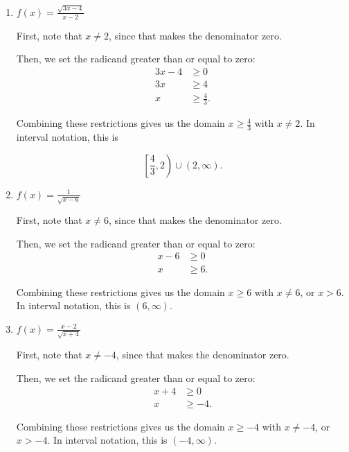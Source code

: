 \documentclass{ximera}
\begin{document}
\begin{enumerate}
	\item $f(x) = \frac{\sqrt{3x - 4}}{x - 2}$
		\begin{explanation}
			\begin{expandable}
First, note that $x \ne 2$, since that makes the denominator zero.

Then, we set the radicand greater than or equal to zero: \begin{align*}3x-4&\ge 0 \\ 3x & \ge 4 \\ x & \ge \frac{4}{3}. \end{align*}

Combining these restrictions gives us the domain $x \ge \frac{4}{3}$ with $x \ne 2$. In interval notation, this is

$$\left[\frac{4}{3}, 2\right) \cup (2, \infty).$$
			\end{expandable}
		\end{explanation}
	\item $f(x) = \frac{1}{\sqrt{x - 6}}$
		\begin{explanation}
			\begin{expandable}

First, note that $x \ne 6$, since that makes the denominator zero.

Then, we set the radicand greater than or equal to zero: \begin{align*}x-6&\ge 0 \\ x & \ge 6. \end{align*}

Combining these restrictions gives us the domain $x \ge 6$ with $x \ne 6$, or $x > 6$. In interval notation, this is $(6, \infty)$.
			\end{expandable}
		\end{explanation}
	\item $f(x) = \frac{x - 2}{\sqrt{x + 4}}$
		\begin{explanation}
			\begin{expandable}
First, note that $x \ne -4$, since that makes the denominator zero.

Then, we set the radicand greater than or equal to zero: \begin{align*}x + 4&\ge 0 \\ x & \ge -4. \end{align*}

Combining these restrictions gives us the domain $x \ge -4$ with $x \ne -4$, or $x > -4$. In interval notation, this is $(-4, \infty)$.


\end{expandable}
\end{explanation}
\end{enumerate}
\end{document}
